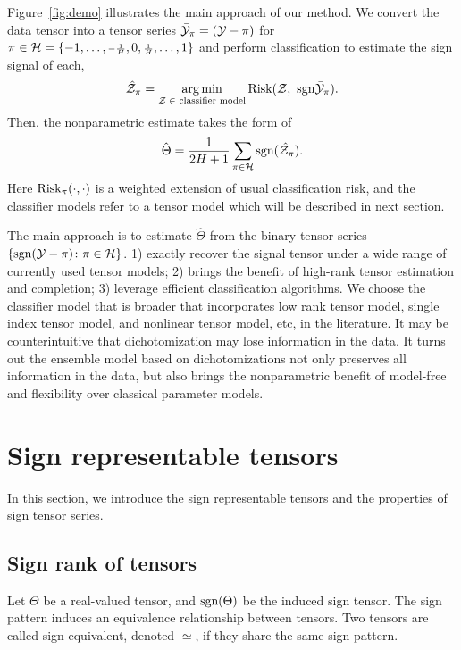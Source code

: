 \documentclass{article}
\theoremstyle{plain}
\theoremstyle{definition}
\def\sign{\textup{sgn}}
\def\risk{\textup{Risk}}
\begin{document}
Figure~\ref{fig:demo} illustrates the main approach of our method. We convert the data tensor into a tensor series $\bar {\mathcal{Y}}_\pi= (\mathcal{Y}-\pi)$ for $\pi\in \mathcal{H}=\{-1,\ldots, {\scriptstyle -{1\over H}},0,{\scriptstyle {1\over H}},\ldots,1\}$ and perform classification to estimate the sign signal of each, 
\[
\hat \tZ_\pi=\argmin_{\text{$\tZ\in $ classifier model}} \risk(\tZ,\ \sign \bar \tY_\pi).
\]
Then, the nonparametric estimate takes the form of
\[
\hat \Theta = {1\over 2H+1}\sum_{\pi \in \tH} \sign(\hat \tZ_\pi).
\]
Here $\risk_\pi(\cdot,\cdot)$ is a weighted extension of usual classification risk, and the classifier models refer to a tensor model which will be described in next section. 

The main approach is to estimate $\hat \Theta$ from the binary tensor series $\{\sign(\tY-\pi)\colon \pi \in \tH\}$. 1) exactly recover the signal tensor under a wide range of currently used tensor models; 2) brings the benefit of high-rank tensor estimation and completion; 3) leverage efficient classification algorithms. 
We choose the classifier model that is broader that incorporates low rank tensor model, single index tensor model, and nonlinear tensor model, etc, in the literature. It may be counterintuitive that dichotomization may lose information in the data. It turns out the ensemble model based on dichotomizations not only preserves all information in the data, but also brings the nonparametric benefit of model-free and flexibility over classical parameter models.


\section{Sign representable tensors}
In this section, we introduce the sign representable tensors and the properties of sign tensor series. 

\subsection{Sign rank of tensors}
Let $\Theta$ be a real-valued tensor, and $\sign (\Theta)$ be the induced sign tensor.  
The sign pattern induces an equivalence relationship between tensors. Two tensors are called sign equivalent, denoted $\simeq$, if they share the same sign pattern. 
\end{document}

